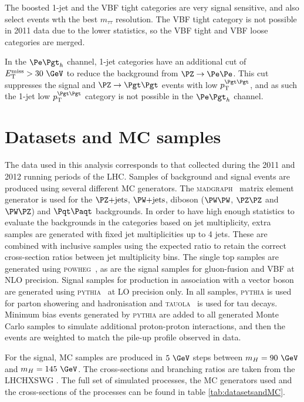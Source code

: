 The boosted 1-jet and the VBF tight categories are very 
signal sensitive, and also select events wth the best $m_{\tau\tau}$ resolution.
The VBF tight category is not possible in 2011 data due to the lower statistics,
so the VBF tight and VBF loose categories are merged. 

In the $\etau$ channel, 1-jet categories have an additional cut of $\MET >
30~\GeV$ to reduce the background from $\PZ\to\Pe\Pe$. This cut suppresses the
signal and $\ZToTauTau$ events with low $\pt^{\Pgt\Pgt}$, and as such the 1-jet low
$\pt^{\Pgt\Pgt}$ category is not possible in the $\etau$ channel.  

\section{Datasets and \ac{MC} samples}
\label{sec:dataandMC}

The data used in this analysis corresponds to that collected during the 2011 and
2012 running periods of the \ac{LHC}. Samples of background and signal events are produced using several different
\ac{MC} generators. The \textsc{madgraph}~\cite{Alwall:2011uj} matrix element
generator is used for the $\ZJets$, $\WJets$, diboson ($\PW\PW$, $\PZ\PZ$ and
$\PW\PZ$) and $\ttbar$ backgrounds. 
In order to have high enough statistics to evaluate the
backgrounds in the categories based on jet multiplicity, extra samples are
generated with fixed jet multiplicities up to 4 jets. These are combined with
inclusive samples using the expected ratio to retain the correct cross-section
ratios between jet multiplicity bins. The single top samples are generated using
\textsc{powheg}~\cite{Frixione:2007vw,Alioli:2010xd,Alioli:2010xa}, as are the
signal samples for gluon-fusion and \ac{VBF} at \ac{NLO} precision. Signal
samples for production in association with a vector boson are generated using
\textsc{pythia}~\cite{Sjostrand:2006za} at \ac{LO} precision only. In all
samples, \textsc{pythia} is used for parton showering and hadronisation and
\textsc{tauola}~\cite{TAUOLA} is used for tau decays. Minimum bias events
generated by \textsc{pythia} are added to all generated Monte Carlo samples
to simulate additional proton-proton interactions, and then the events are
weighted to match the pile-up profile observed in data. 

For the signal, \ac{MC} samples are produced in $5~\GeV$ steps between
$m_{H}=90~\GeV$ and $m_{H}=145~\GeV$. The cross-sections and branching ratios 
are taken from the \ac{LHCHXSWG}
\cite{LHCHiggsCrossSectionWorkingGroup:2011ti,Dittmaier:2012vm,Heinemeyer:2013tqa}.
The full set of simulated processes, the \ac{MC} generators used and the
cross-sections of the processes can be found in table \ref{tab:datasetsandMC}.

